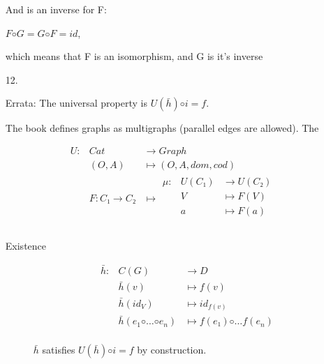 \documentclass{article}
\begin{document}
\begin{enumerate}
    And is an inverse for F:

    $F ◦ G = G ◦ F = id$,

    which means that F is an isomorphism, and G is it's inverse
    
  \item[12.]

    Errata: The universal property is $U(\bar{h}) ◦ i = f$.

    The book defines graphs as multigraphs (parallel edges are allowed). The 

    \begin{equation}
    \begin{array}{rll}
    U : & Cat         & → Graph            \\
        & (O, A)      & ↦ (O, A, dom, cod) \\
        & F : C₁ → C₂ & ↦
            \begin{array}{rll}
              μ : & U(C₁)       & → U(C₂)                 \\
                  &  V          & ↦ F(V)                  \\
                  & a           & ↦ F(a) \\ 
            \end{array}
            \\
    \end{array}
    \end{equation}
    
    \begin{description}
      \item[Existence]

        \begin{equation}
          \begin{array}{rll}
            \bar{h} : & C(G)    & → D                                     \\
                      & \bar{h}(v)                & ↦  f(v)               \\                
                      & \bar{h}(id_V)             & ↦  id_{f(v)}            \\                
                      & \bar{h}(e_1 ◦ … ◦ e_n)    & ↦  f(e₁) ◦ … f(e_n)    \\                
          \end{array}
        \end{equation}

        $\bar{h}$ satisfies $U(\bar{h}) ◦ i = f$ by construction. 


\end{description}
\end{enumerate}
\end{document}
